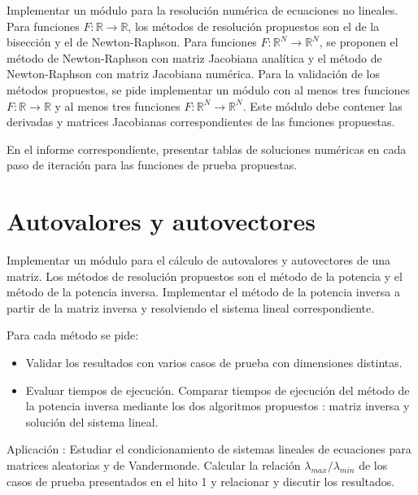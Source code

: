    
   
   Implementar un módulo para la resolución numérica de ecuaciones no lineales.
   Para funciones  $F:\mathbb{R} \rightarrow \mathbb{R}$, los métodos de resolución propuestos son el de la bisección y el de 
   Newton-Raphson.   
   Para funciones  $F:\mathbb{R}^N \rightarrow \mathbb{R}^N$, se proponen el método de Newton-Raphson con matriz Jacobiana analítica y 
   el método de Newton-Raphson con matriz Jacobiana numérica.
   Para la validación de los métodos propuestos, se pide implementar un módulo con al menos tres funciones $F:\mathbb{R} \rightarrow \mathbb{R}$
   y al menos tres funciones $F:\mathbb{R}^N \rightarrow \mathbb{R}^N$. Este módulo debe contener las derivadas y matrices Jacobianas correspondientes de las funciones propuestas.  
   
   En el informe correspondiente, presentar tablas de soluciones numéricas en cada paso de iteración para las funciones de prueba propuestas.
   
   
   
   
   
   
   \section{Autovalores y autovectores \label{autovalores_autovectores} }
   
   
   Implementar un módulo para el cálculo de autovalores y autovectores de una matriz.
   Los métodos de resolución propuestos son el método de la potencia y el método de la potencia inversa.
   Implementar el método de la potencia inversa a partir de la matriz inversa y resolviendo el sistema lineal
   correspondiente. 
   
   Para cada método se pide:
   \begin{itemize}
    \item Validar los resultados con varios casos de prueba con dimensiones distintas.
    \item Evaluar tiempos de ejecución. Comparar tiempos de ejecución del método de la potencia inversa
    mediante los dos algoritmos propuestos : matriz inversa y solución del sistema lineal.       
   \end{itemize}
   
   Aplicación : Estudiar el condicionamiento de sistemas lineales de ecuaciones para matrices
   aleatorias y de Vandermonde. Calcular la relación $\lambda_{max} / \lambda_{min}$ de los casos de prueba
   presentados en el hito 1 y relacionar y discutir los resultados. 
   
